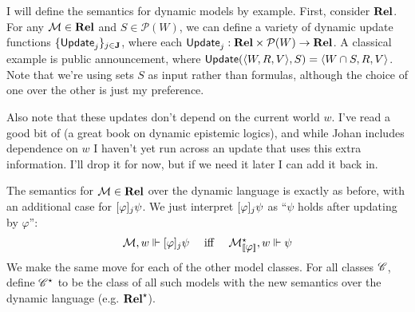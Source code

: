 \documentclass[letterpaper]{article}
\begin{document}
I will define the semantics for dynamic models by example.  First, consider $\textrm{\textbf{Rel}}$.  For any $\mathcal{M} \in \textrm{\textbf{Rel}}$ and $S \in \mathcal{P}(W)$, we can define a variety of dynamic update functions $\{ \mathsf{Update}_j \}_{j \in \textbf{J}}$, where each $\mathsf{Update}_j : \textrm{\textbf{Rel}} \times \mathcal{P}(W) \to \textrm{\textbf{Rel}}$.  A classical example is public announcement, where $\mathsf{Update}(\langle W, R, V \rangle, S) = \langle W \cap S, R, V \rangle$.  Note that we're using sets $S$ as input rather than formulas, although the choice of one over the other is just my preference.

Also note that these updates don't depend on the current world $w$.  I've read a good bit of \cite{van2011logicaldynamics} (a great book on dynamic epistemic logics), and while Johan includes dependence on $w$ I haven't yet run across an update that uses this extra information.  I'll drop it for now, but if we need it later I can add it back in.

The semantics for $\mathcal{M} \in \textrm{\textbf{Rel}}$ over the dynamic language is exactly as before, with an additional case for $[\varphi]_j \psi$.  We just interpret $[\varphi]_j \psi$ as ``$\psi$ holds after updating by $\varphi$'':
\[
\begin{array}{lcl}
    \mathcal{M}, w \Vdash [\varphi]_j \psi & \mbox{ iff } & \mathcal{M}^\star_{[\![\mbox{\em $ \varphi $\/}]\!]}, w \Vdash \psi
\end{array}
\]
We make the same move for each of the other model classes.  For all classes $\mathscr{C}$, define $\mathscr{C}^\star$ to be the class of all such models with the new semantics over the dynamic language (e.g. $\textrm{\textbf{Rel}}^\star$).




\end{document}
